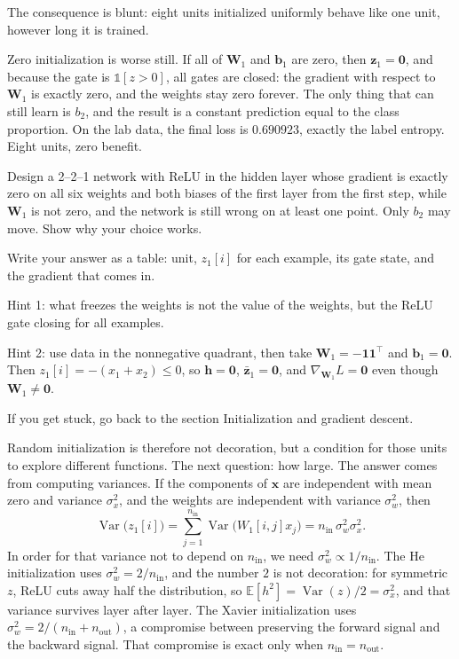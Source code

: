 The consequence is blunt: eight units initialized uniformly behave like one unit, however long
it is trained.

Zero initialization is worse still. If all of $\mathbf{W}_{1}$ and $\mathbf{b}_{1}$ are zero,
then $\mathbf{z}_{1}=\mathbf{0}$, and because the gate is $\mathbb{1}[z>0]$, all gates are
closed: the gradient with respect to $\mathbf{W}_{1}$ is exactly zero, and the weights stay zero
forever. The only thing that can still learn is $b_{2}$, and the result is a constant prediction
equal to the class proportion. On the lab data, the final loss is $0.690923$, exactly the label
entropy. Eight units, zero benefit.

\begin{tantangan}
Design a 2--2--1 network with ReLU in the hidden layer whose gradient is exactly zero on all six
weights and both biases of the first layer from the first step, while $\mathbf{W}_{1}$ is not
zero, and the network is still wrong on at least one point. Only $b_{2}$ may move. Show why your
choice works.

Write your answer as a table: unit, $z_{1}[i]$ for each example, its gate state, and the gradient
that comes in.

Hint 1: what freezes the weights is not the value of the weights, but the ReLU gate closing for
all examples.

Hint 2: use data in the nonnegative quadrant, then take
$\mathbf{W}_{1}=-\mathbf{1}\mathbf{1}^{\top}$ and $\mathbf{b}_{1}=\mathbf{0}$. Then
$z_{1}[i]=-(x_{1}+x_{2})\le0$, so $\mathbf{h}=\mathbf{0}$,
$\bar{\mathbf{z}}_{1}=\mathbf{0}$, and $\nabla_{\mathbf{W}_{1}}L=\mathbf{0}$ even though
$\mathbf{W}_{1}\neq\mathbf{0}$.

If you get stuck, go back to the section Initialization and gradient descent.
\end{tantangan}


Random initialization is therefore not decoration, but a condition for those units to explore
different functions. The next question: how large. The answer comes from computing variances. If
the components of $\mathbf{x}$ are independent with mean zero and variance $\sigma_{x}^{2}$, and
the weights are independent with variance $\sigma_{w}^{2}$, then
\[
  \operatorname{Var}\bigl(z_{1}[i]\bigr)
  =\sum_{j=1}^{n_{\mathrm{in}}}\operatorname{Var}\bigl(W_{1}[i,j]x_{j}\bigr)
  =n_{\mathrm{in}}\,\sigma_{w}^{2}\sigma_{x}^{2}.
\]
In order for that variance not to depend on $n_{\mathrm{in}}$, we need
$\sigma_{w}^{2}\propto1/n_{\mathrm{in}}$. The He initialization uses
$\sigma_{w}^{2}=2/n_{\mathrm{in}}$, and the number $2$ is not decoration: for symmetric $z$,
ReLU cuts away half the distribution, so $\mathbb{E}[h^{2}]=\operatorname{Var}(z)/2=\sigma_{x}^{2}$,
and that variance survives layer after layer. The Xavier initialization uses
$\sigma_{w}^{2}=2/(n_{\mathrm{in}}+n_{\mathrm{out}})$, a compromise between preserving the forward
signal and the backward signal. That compromise is exact only when
$n_{\mathrm{in}}=n_{\mathrm{out}}$.

